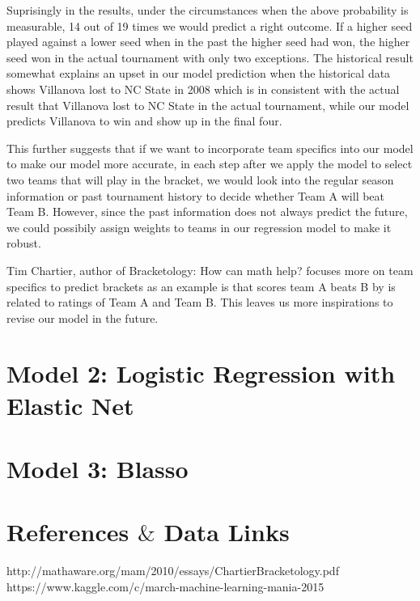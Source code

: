 \documentclass{article} %
\begin{document}
Suprisingly in the results, under the circumstances when the above probability is measurable, 14 out of 19 times we would predict a right outcome. If a higher seed played against a lower seed when in the past the higher seed had won, the higher seed won in the actual tournament with only two exceptions. The historical result somewhat explains an upset in our model prediction when the historical data shows Villanova lost to NC State in 2008 which is in consistent with the actual result that Villanova lost to NC State in the actual tournament, while our model predicts Villanova to win and show up in the final four. 

This further suggests that if we want to incorporate team specifics into our model to make our model more accurate, in each step after we apply the model to select two teams that will play in the bracket, we would look into the regular season information or past tournament history to decide whether Team A will beat Team B. However, since the past information does not always predict the future, we could possibily assign weights to teams in our regression model to make it robust. 

Tim Chartier, author of Bracketology: How can math help? focuses more on team specifics to predict brackets as an example is that scores team A beats B by is related to ratings of Team A and Team B. This leaves us more inspirations to revise our model in the future. 






\section{Model 2: Logistic Regression with Elastic Net}
\section{Model 3: Blasso}








\section{References $\&$ Data Links}
http://mathaware.org/mam/2010/essays/ChartierBracketology.pdf
https://www.kaggle.com/c/march-machine-learning-mania-2015
\end{document}
